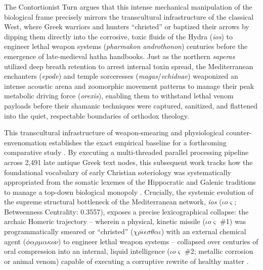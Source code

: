 \documentclass[11pt,twoside,letterpaper]{article}
\begin{document}
The Contortionist Turn argues that this intense mechanical manipulation of the biological frame precisely mirrors the transcultural infrastructure of the classical West, where Greek warriors and hunters ``christed'' or baptized their arrows by dipping them directly into the corrosive, toxic fluids of the Hydra (\textit{ios}) to engineer lethal weapon systems (\textit{pharmakon androthonon}) centuries before the emergence of late-medieval hatha handbooks. Just as the northern \textit{saperas} utilized deep breath retention to arrest internal toxin spread, the Mediterranean enchanters (\textit{epode}) and temple sorceresses (\textit{magas}/\textit{echidnae}) weaponized an intense acoustic arena and zoomorphic movement patterns to manage their peak metabolic driving force (\textit{orexis}), enabling them to withstand lethal venom payloads before their shamanic techniques were captured, sanitized, and flattened into the quiet, respectable boundaries of orthodox theology.

This transcultural infrastructure of weapon-smearing and physiological counter-envenomation establishes the exact empirical baseline for a forthcoming comparative study \citep{mccartneyforthcomingD}. By executing a multi-threaded parallel processing pipeline across 2,491 late antique Greek text nodes, this subsequent work tracks how the foundational vocabulary of early Christian soteriology was systematically appropriated from the somatic lexemes of the Hippocratic and Galenic traditions to manage a top-down biological monopoly \citep{mccartneyforthcomingD}. Crucially, the systemic evolution of the supreme structural bottleneck of the Mediterranean network, \textit{ios} ($\iota\mathit{o}\varsigma$; Betweenness Centrality: 0.3557), exposes a precise lexicographical collapse: the archaic Homeric trajectory -- wherein a physical, kinetic missile ($\iota\mathit{o}\varsigma$ \#1) was programmatically smeared or ``christed'' ($\chi\rho\mathit{\acute{\iota}}\epsilon\sigma\theta\alpha\iota$) with an external chemical agent ($\phi\alpha\rho\mu\alpha\kappa\mathit{o}\nu$) to engineer lethal weapon systems -- collapsed over centuries of oral compression into an internal, liquid intelligence ($\iota\mathit{o}\varsigma$ \#2; metallic corrosion or animal venom) capable of executing a corruptive rewrite of healthy matter \citep{mccartneyforthcomingD}. 
\end{document}
